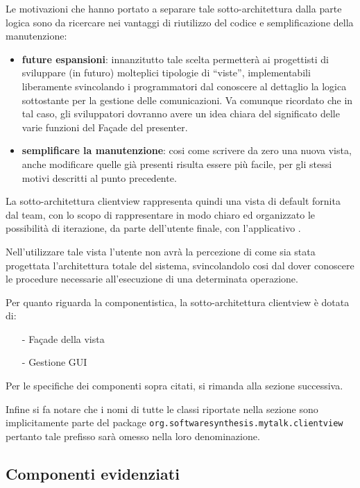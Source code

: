 Le motivazioni che hanno portato a separare tale sotto-architettura dalla parte logica sono da ricercare nei vantaggi di riutilizzo del codice e semplificazione della manutenzione:
\begin{itemize}
 	\item \textbf{future espansioni}: innanzitutto tale scelta permetterà ai progettisti di sviluppare (in futuro) molteplici tipologie di ``viste'', implementabili liberamente svincolando i programmatori dal conoscere al dettaglio la logica sottostante per la gestione delle comunicazioni. Va comunque ricordato che in tal caso, gli sviluppatori dovranno avere un idea chiara del significato delle varie funzioni del Façade del presenter.
 	\item \textbf{semplificare la manutenzione}: cosi come scrivere da zero una nuova vista, anche modificare quelle già presenti risulta essere più facile, per gli stessi motivi descritti al punto precedente.
\end{itemize}

La sotto-architettura clientview rappresenta quindi una vista di default fornita dal team, con lo scopo di rappresentare in modo chiaro ed organizzato le possibilità di iterazione, da parte dell'utente finale, con l'applicativo \caName{}.

Nell'utilizzare tale vista l'utente non avrà la percezione di come sia stata progettata l'architettura totale del sistema, svincolandolo cosi dal dover conoscere le procedure necessarie all'esecuzione di una determinata operazione.

Per quanto riguarda la componentistica, la sotto-architettura clientview è dotata di:
\begin{itemize}[noitemsep,nolistsep]
	\item[-] Façade della vista
	\item[-] Gestione GUI
\end{itemize}

Per le specifiche dei componenti sopra citati, si rimanda alla sezione successiva.

Infine si fa notare che i nomi di tutte le classi riportate nella sezione sono implicitamente parte del package \texttt{org.softwaresynthesis.mytalk.clientview} pertanto tale prefisso sarà omesso nella loro denominazione.

\subsection{Componenti evidenziati}

